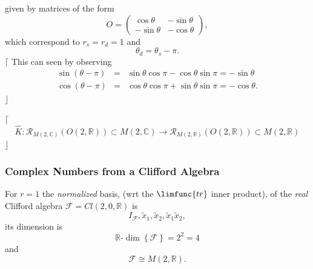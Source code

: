 \documentclass[aps,preprint]{revtex4}
\begin{document}
given by matrices of the form 
\begin{equation}
O=\left( 
\begin{array}{cc}
\cos \theta & -\sin \theta \\ 
-\sin \theta & -\cos \theta%
\end{array}%
\right) ,
\end{equation}%
which correspond to $r_{s}=r_{d}=1$ and 
\begin{equation}
\theta _{d}=\theta _{s}-\pi .
\end{equation}%
$\lceil $ This can seen by observing%
\begin{eqnarray}
\sin \left( \theta -\pi \right) &=&\sin \theta \cos \pi -\cos \theta \sin
\pi =-\sin \theta \\
\cos \left( \theta -\pi \right) &=&\cos \theta \cos \pi +\sin \theta \sin
\pi =-\cos \theta .
\end{eqnarray}%
$\rfloor $

$\lceil $%
\begin{equation}
\widehat{K}:\mathcal{R}_{M\left( 2,\mathbb{C}\right) }\left( O\left( 2,%
\mathbb{R}\right) \right) \subset M\left( 2,\mathbb{C}\right) \rightarrow 
\mathcal{R}_{M\left( 2,\mathbb{R}\right) }\left( O\left( 2,\mathbb{R}\right)
\right) \subset M\left( 2,\mathbb{R}\right)
\end{equation}%
$\rfloor $

\subsubsection{Complex Numbers from a Clifford Algebra}

For $r=1$ the \emph{normalized} basis, (wrt the $\limfunc{tr}$ inner
product), of the \emph{real} Clifford algebra $\mathcal{F}=Cl\left( 2,0,%
\mathbb{R}\right) $ is 
\begin{equation}
I_{\mathcal{F}},\widetilde{x}_{1},\widetilde{x}_{2},\widetilde{x}_{1}%
\widetilde{x}_{2},
\end{equation}%
its dimension is%
\begin{equation}
\mathbb{R}\text{-}\dim \left\{ \mathcal{F}\right\} =2^{2}=4
\end{equation}%
and 
\begin{equation}
\mathcal{F}\cong M\left( 2,\mathbb{R}\right) .
\end{equation}
\end{document}

